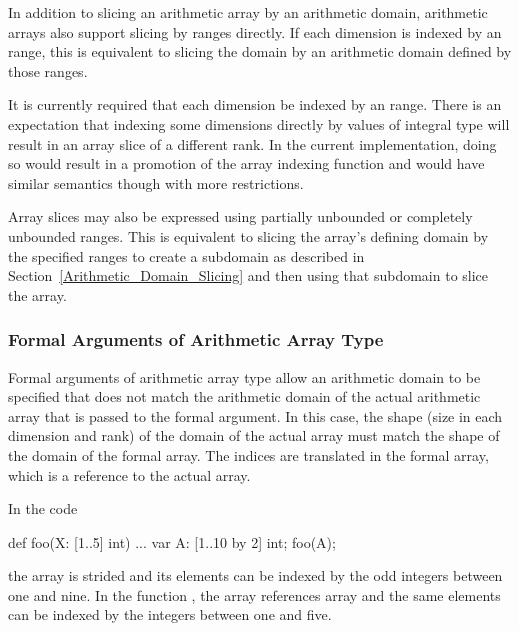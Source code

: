 In addition to slicing an arithmetic array by an arithmetic domain,
arithmetic arrays also support slicing by ranges directly.  If each
dimension is indexed by an range, this is equivalent to slicing the
domain by an arithmetic domain defined by those ranges.

\begin{status}
It is currently required that each dimension be indexed by an range.
There is an expectation that indexing some dimensions directly by
values of integral type will result in an array slice of a different
rank.  In the current implementation, doing so would result in a
promotion of the array indexing function and would have similar
semantics though with more restrictions.
\end{status}

Array slices may also be expressed using partially unbounded or
completely unbounded ranges.  This is equivalent to slicing the
array's defining domain by the specified ranges to create a subdomain
as described in Section~\ref{Arithmetic_Domain_Slicing} and then using
that subdomain to slice the array.

\subsubsection{Formal Arguments of Arithmetic Array Type}
\label{Formal_Arguments_of_Arithmetic_Array_Type}

Formal arguments of arithmetic array type allow an arithmetic domain
to be specified that does not match the arithmetic domain of the
actual arithmetic array that is passed to the formal argument.  In
this case, the shape (size in each dimension and rank) of the domain
of the actual array must match the shape of the domain of the formal
array.  The indices are translated in the formal array, which is a
reference to the actual array.

\begin{example}
In the code
\begin{chapel}
def foo(X: [1..5] int) { ... }
var A: [1..10 by 2] int;
foo(A);
\end{chapel}
the array  is strided and its elements can be indexed by the
odd integers between one and nine.  In the function , the
array  references array  and the same elements can be
indexed by the integers between one and five.
\end{example}


